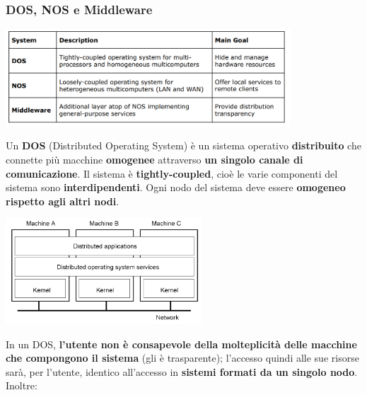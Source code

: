 \documentclass[12pt]{article}
\begin{document}
\subsubsection{DOS, NOS e Middleware}
\begin{center}
    \includegraphics[width = 0.80\textwidth]{Images/10.PNG}
\end{center}
Un \textbf{DOS} (Distributed Operating System) è un sistema operativo \textbf{distribuito} che connette più macchine \textbf{omogenee} attraverso \textbf{un singolo canale di comunicazione}. Il sistema è \textbf{tightly-coupled}, cioè le varie componenti del sistema sono \textbf{interdipendenti}. Ogni nodo del sistema deve essere \textbf{omogeneo rispetto agli altri nodi}.
\begin{center}
    \includegraphics[width = 0.55\textwidth]{Images/11.PNG}
\end{center}
In un DOS, \textbf{l'utente non è consapevole della molteplicità delle macchine che compongono il sistema} (gli è trasparente); l'accesso quindi alle sue risorse sarà, per l'utente, identico all'accesso in \textbf{sistemi formati da un singolo nodo}. Inoltre:
\end{document}
